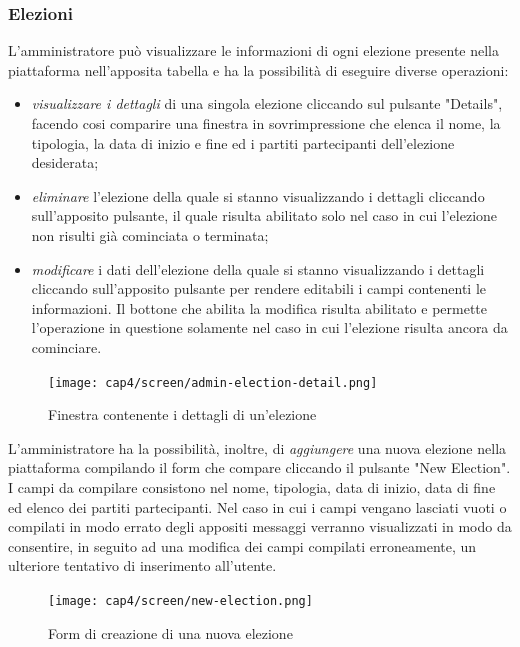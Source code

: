 \subsubsection{Elezioni}
L'amministratore può visualizzare le informazioni di ogni elezione presente nella piattaforma nell'apposita tabella e ha la possibilità di eseguire diverse operazioni:
\begin{itemize}
    \item \textit{visualizzare i dettagli} di una singola elezione cliccando sul pulsante "Details", facendo cosi comparire una finestra in sovrimpressione che elenca il nome, la tipologia, la data di inizio e fine ed i partiti partecipanti dell'elezione desiderata;
    \item \textit{eliminare} l'elezione della quale si stanno visualizzando i dettagli cliccando sull'apposito pulsante, il quale risulta abilitato solo nel caso in cui l'elezione non risulti già cominciata o terminata;
    \item \textit{modificare} i dati dell'elezione della quale si stanno visualizzando i dettagli cliccando sull'apposito pulsante per rendere editabili i campi contenenti le informazioni. Il bottone che abilita la modifica risulta abilitato e permette l'operazione in questione solamente nel caso in cui l'elezione risulta ancora da cominciare.
\end{itemize}
\begin{figure}[H] 
    \centering 
    \texttt{[image: cap4/screen/admin-election-detail.png]} 
    \caption{Finestra contenente i dettagli di un'elezione}
\end{figure}
L'amministratore ha la possibilità, inoltre, di \textit{aggiungere} una nuova elezione nella piattaforma compilando il form che compare cliccando il pulsante "New Election". I campi da compilare consistono nel nome, tipologia, data di inizio, data di fine ed elenco dei partiti partecipanti. Nel caso in cui i campi vengano lasciati vuoti o compilati in modo errato degli appositi messaggi verranno visualizzati in modo da consentire, in seguito ad una modifica dei campi compilati erroneamente, un ulteriore tentativo di inserimento all'utente.
\begin{figure}[H] 
    \centering 
    \texttt{[image: cap4/screen/new-election.png]} 
    \caption{Form di creazione di una nuova elezione}
\end{figure}

